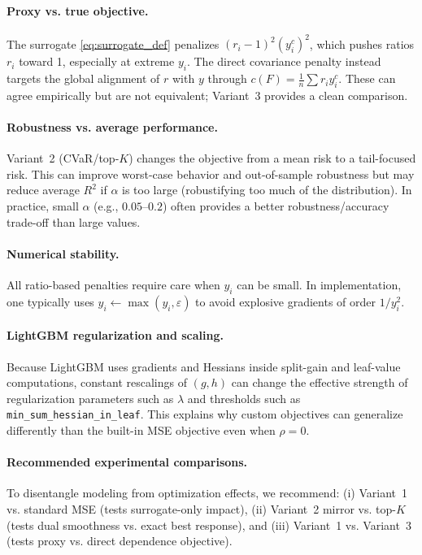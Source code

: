 \documentclass[11pt]{article}
\theoremstyle{plain}
\theoremstyle{definition}
\newcommand{\1}{\mathbf{1}}
\begin{document}
\paragraph{Proxy vs. true objective.}
The surrogate \eqref{eq:surrogate_def} penalizes $(r_i-1)^2(y_i^c)^2$, which pushes ratios $r_i$ toward 1, especially at extreme $y_i$. The direct covariance penalty instead targets the global alignment of $r$ with $y$ through $c(F)=\frac{1}{n}\sum r_i y_i^c$. These can agree empirically but are not equivalent; Variant~3 provides a clean comparison.

\paragraph{Robustness vs. average performance.}
Variant~2 (CVaR/top-$K$) changes the objective from a mean risk to a tail-focused risk. This can improve worst-case behavior and out-of-sample robustness but may reduce average $R^2$ if $\alpha$ is too large (robustifying too much of the distribution). In practice, small $\alpha$ (e.g., $0.05$--$0.2$) often provides a better robustness/accuracy trade-off than large values.

\paragraph{Numerical stability.}
All ratio-based penalties require care when $y_i$ can be small. In implementation, one typically uses $y_i\leftarrow \max(y_i,\varepsilon)$ to avoid explosive gradients of order $1/y_i^2$.

\paragraph{LightGBM regularization and scaling.}
Because LightGBM uses gradients and Hessians inside split-gain and leaf-value computations, constant rescalings of $(g,h)$ can change the effective strength of regularization parameters such as $\lambda$ and thresholds such as \texttt{min\_sum\_hessian\_in\_leaf}. This explains why custom objectives can generalize differently than the built-in MSE objective even when $\rho=0$.

\paragraph{Recommended experimental comparisons.}
To disentangle modeling from optimization effects, we recommend:
(i) Variant~1 vs. standard MSE (tests surrogate-only impact),
(ii) Variant~2 mirror vs. top-$K$ (tests dual smoothness vs. exact best response), and
(iii) Variant~1 vs. Variant~3 (tests proxy vs. direct dependence objective).
\end{document}
